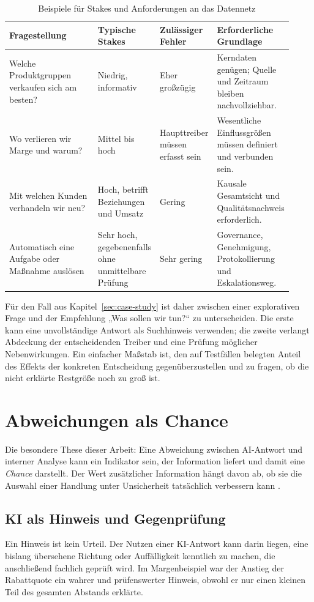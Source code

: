 \documentclass[a4paper,12pt,twoside]{report}
\theoremstyle{definition}
\begin{document}
\begin{table}[htbp]
\centering
\small
\caption{Beispiele für Stakes und Anforderungen an das Datennetz}
\label{tab:stakes}
\begin{tabular}{p{0.34\linewidth}p{0.20\linewidth}p{0.19\linewidth}p{0.19\linewidth}}
\toprule
\textbf{Fragestellung} & \textbf{Typische Stakes} & \textbf{Zulässiger Fehler} & \textbf{Erforderliche Grundlage} \\
\midrule
Welche Produktgruppen verkaufen sich am besten? & Niedrig, informativ & Eher großzügig & Kerndaten genügen; Quelle und Zeitraum bleiben nachvollziehbar. \\
Wo verlieren wir Marge und warum? & Mittel bis hoch & Haupttreiber müssen erfasst sein & Wesentliche Einflussgrößen müssen definiert und verbunden sein. \\
Mit welchen Kunden verhandeln wir neu? & Hoch, betrifft Beziehungen und Umsatz & Gering & Kausale Gesamtsicht und Qualitätsnachweis erforderlich. \\
Automatisch eine Aufgabe oder Maßnahme auslösen & Sehr hoch, gegebenenfalls ohne unmittelbare Prüfung & Sehr gering & Governance, Genehmigung, Protokollierung und Eskalationsweg. \\
\bottomrule
\end{tabular}
\end{table}

Für den Fall aus Kapitel~\ref{sec:case-study} ist daher zwischen einer explorativen Frage und der Empfehlung „Was sollen wir tun?“ zu unterscheiden. Die erste kann eine unvollständige Antwort als Suchhinweis verwenden; die zweite verlangt Abdeckung der entscheidenden Treiber und eine Prüfung möglicher Nebenwirkungen. Ein einfacher Maßstab ist, den auf Testfällen belegten Anteil des Effekts der konkreten Entscheidung gegenüberzustellen und zu fragen, ob die nicht erklärte Restgröße noch zu groß ist.

\chapter{Abweichungen als Chance}\label{sec:opportunity}
Die besondere These dieser Arbeit: Eine Abweichung zwischen AI-Antwort und interner Analyse kann ein Indikator sein, der Information liefert und damit eine \emph{Chance} darstellt. Der Wert zusätzlicher Information hängt davon ab, ob sie die Auswahl einer Handlung unter Unsicherheit tatsächlich verbessern kann \cite{howard66,raiffa68}.

\section{KI als Hinweis und Gegenprüfung}
Ein Hinweis ist kein Urteil. Der Nutzen einer KI-Antwort kann darin liegen, eine bislang übersehene Richtung oder Auffälligkeit kenntlich zu machen, die anschließend fachlich geprüft wird. Im Margenbeispiel war der Anstieg der Rabattquote ein wahrer und prüfenswerter Hinweis, obwohl er nur einen kleinen Teil des gesamten Abstands erklärte.
\end{document}
